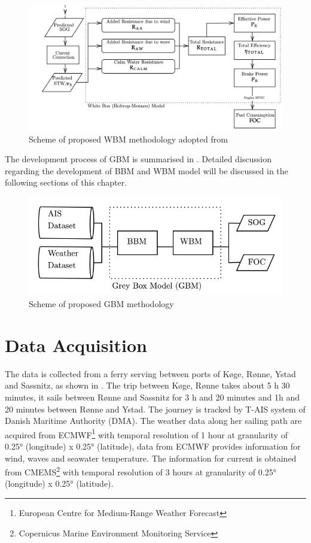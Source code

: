 \begin{figure}[h]
    \centering
        \includegraphics[width=\textwidth]{02_figures/flowmethod_WBM.png}
        \caption{Scheme of proposed WBM methodology adopted from }
        \label{fig:flowchart_WBM}
\end{figure}

The development process of GBM is summarised in . Detailed discussion regarding the development of BBM and WBM model will be discussed in the following sections of this chapter.

\begin{figure}[h]
    \centering
        \includegraphics[width=\textwidth]{02_figures/flowmethod_GBM.png}
        \caption{Scheme of proposed GBM methodology}
        \label{fig:flowchart_GBM}
\end{figure}


\section{Data Acquisition}\label{sec:data_acquisition}

The data is collected from a ferry serving between ports of K{\o}ge, R{\o}nne, Ystad and Sassnitz, as shown in  . The trip between K{\o}ge, R{\o}nne takes about 5 h 30 minutes, it sails between R{\o}nne and Sassnitz for 3 h and 20 minutes and 1h and 20 minutes between R{\o}nne and Ystad. The journey is tracked by T-AIS system of Danish Maritime Authority (DMA). The weather data along her sailing path are acquired from ECMWF\footnote{European Centre for Medium-Range Weather Forecast} with temporal resolution of 1 hour at granularity of 0.25° (longitude) x 0.25° (latitude), data from ECMWF provides information for wind, waves and seawater temperature. The information for current is obtained from CMEMS\footnote{Copernicus Marine Environment Monitoring Service} with temporal resolution of 3 hours at granularity of  0.25° (longitude) x 0.25° (latitude).\\ 

